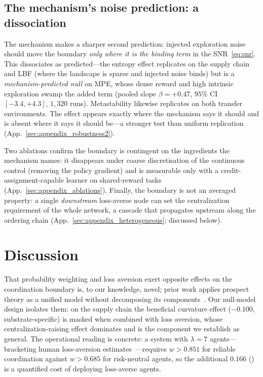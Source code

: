 \documentclass[letterpaper]{article}
\theoremstyle{plain}
\begin{document}
\subsection{The mechanism's noise prediction: a dissociation}
\label{sec:dissociation}
The mechanism makes a sharper second prediction: injected exploration noise should
move the boundary \emph{only where it is the binding term} in the
SNR~\eqref{eq:snr}. This dissociates as predicted---the entropy effect replicates
on the supply chain and LBF (where the landscape is sparse and injected noise
binds) but is a \emph{mechanism-predicted null} on MPE, whose dense reward and
high intrinsic exploration swamp the added term (pooled slope $\beta{=}{+}0.47$,
$95\%$ CI $[-3.4,+4.3]$, $1{,}320$ runs). Metastability likewise replicates on
both transfer environments. The effect appears exactly where the mechanism says
it should and is absent where it says it should be---a stronger test than uniform
replication (App.~\ref{sec:appendix_robustness2}).


Two ablations confirm the boundary is contingent on the ingredients the
mechanism names: it disappears under coarse discretisation of the continuous
control (removing the policy gradient) and is measurable only with a
credit-assignment-capable learner on shared-reward tasks
(App.~\ref{sec:appendix_ablations}). Finally, the boundary is not an averaged
property: a single \emph{downstream} loss-averse node can set the centralization
requirement of the whole network, a cascade that propagates upstream along the
ordering chain (App.~\ref{sec:appendix_heterogeneous}; discussed below).
\section{Discussion}
\label{sec:discussion}

That probability weighting and loss aversion exert opposite effects on the
coordination boundary is, to our knowledge, novel; prior work applies prospect
theory as a unified model without decomposing its
components~\citep{lalmohammed2025,ghaemi2024risk}. Our null-model design isolates
them: on the supply chain the beneficial curvature effect ($-0.100$,
substrate-specific) is masked when combined with loss aversion, whose
centralization-raising effect dominates and is the component we establish as
general. The operational reading is concrete: a system with $\lambda{=}7$
agents---bracketing human loss-aversion estimates~\citep{tversky1992}---requires
$w>0.851$ for reliable coordination against $w>0.685$ for risk-neutral agents,
so the additional $0.166$ () is a quantified cost of
deploying loss-averse agents.
\end{document}
